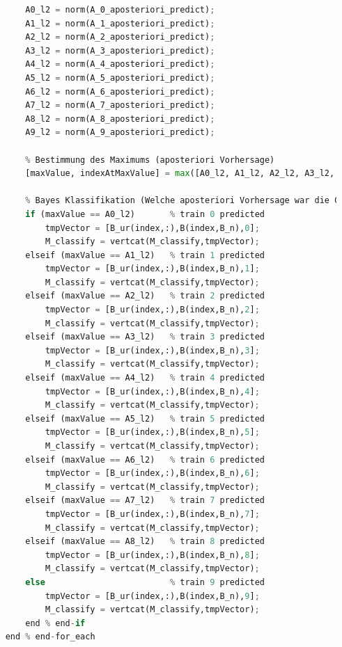 \documentclass[12pt]{article}
\begin{document}
\begin{lstlisting}[language=Python]
        % L2 Norm der aposteriori Vorhersage
        A0_l2 = norm(A_0_aposteriori_predict);
        A1_l2 = norm(A_1_aposteriori_predict);
        A2_l2 = norm(A_2_aposteriori_predict);
        A3_l2 = norm(A_3_aposteriori_predict);
        A4_l2 = norm(A_4_aposteriori_predict);
        A5_l2 = norm(A_5_aposteriori_predict);
        A6_l2 = norm(A_6_aposteriori_predict);
        A7_l2 = norm(A_7_aposteriori_predict);
        A8_l2 = norm(A_8_aposteriori_predict);
        A9_l2 = norm(A_9_aposteriori_predict);
    
        % Bestimmung des Maximums (aposteriori Vorhersage)
        [maxValue, indexAtMaxValue] = max([A0_l2, A1_l2, A2_l2, A3_l2, A4_l2, A5_l2, A6_l2, A7_l2, A8_l2, A9_l2]);
    
        % Bayes Klassifikation (Welche aposteriori Vorhersage war die Groesste?)
        if (maxValue == A0_l2)       % train 0 predicted
            tmpVector = [B_ur(index,:),B(index,B_n),0];
            M_classify = vertcat(M_classify,tmpVector);
        elseif (maxValue == A1_l2)   % train 1 predicted
            tmpVector = [B_ur(index,:),B(index,B_n),1];
            M_classify = vertcat(M_classify,tmpVector);
        elseif (maxValue == A2_l2)   % train 2 predicted
            tmpVector = [B_ur(index,:),B(index,B_n),2];
            M_classify = vertcat(M_classify,tmpVector);
        elseif (maxValue == A3_l2)   % train 3 predicted
            tmpVector = [B_ur(index,:),B(index,B_n),3];
            M_classify = vertcat(M_classify,tmpVector);
        elseif (maxValue == A4_l2)   % train 4 predicted
            tmpVector = [B_ur(index,:),B(index,B_n),4];
            M_classify = vertcat(M_classify,tmpVector);
        elseif (maxValue == A5_l2)   % train 5 predicted
            tmpVector = [B_ur(index,:),B(index,B_n),5];
            M_classify = vertcat(M_classify,tmpVector);
        elseif (maxValue == A6_l2)   % train 6 predicted
            tmpVector = [B_ur(index,:),B(index,B_n),6];
            M_classify = vertcat(M_classify,tmpVector);
        elseif (maxValue == A7_l2)   % train 7 predicted
            tmpVector = [B_ur(index,:),B(index,B_n),7];
            M_classify = vertcat(M_classify,tmpVector);
        elseif (maxValue == A8_l2)   % train 8 predicted
            tmpVector = [B_ur(index,:),B(index,B_n),8];
            M_classify = vertcat(M_classify,tmpVector);
        else                         % train 9 predicted
            tmpVector = [B_ur(index,:),B(index,B_n),9];
            M_classify = vertcat(M_classify,tmpVector);
        end % end-if
    end % end-for_each
    

\end{lstlisting}
\end{document}
